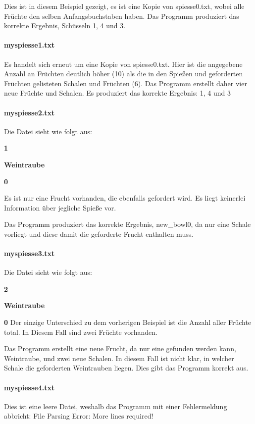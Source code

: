 \documentclass[a4paper,10pt,ngerman]{scrartcl}
\begin{document}
Dies ist in diesem Beispiel gezeigt, es ist eine Kopie von spiesse0.txt, wobei alle Früchte den selben Anfangsbuchstaben haben.
Das Programm produziert das korrekte Ergebnis, Schüsseln 1, 4 und 3.

\paragraph{myspiesse1.txt}
Es handelt sich erneut um eine Kopie von spiesse0.txt.
Hier ist die angegebene Anzahl an Früchten deutlich höher (10) als die in den Spießen und geforderten Früchten gelisteten Schalen und Früchten (6).
Das Programm erstellt daher vier neue Früchte und Schalen.
Es produziert das korrekte Ergebnis: 1, 4 und 3

\paragraph{myspiesse2.txt}
Die Datei sieht wie folgt aus:

\textbf{1}

\textbf{Weintraube}

\textbf{0}

Es ist nur eine Frucht vorhanden, die ebenfalls gefordert wird.
Es liegt keinerlei Information über jegliche Spieße vor.

Das Programm produziert das korrekte Ergebnis, new\_bowl0, da nur eine Schale vorliegt und diese damit die geforderte Frucht enthalten muss.

\paragraph{myspiesse3.txt}
Die Datei sieht wie folgt aus:

\textbf{2}

\textbf{Weintraube}

\textbf{0}
Der einzige Unterschied zu dem vorherigen Beispiel ist die Anzahl aller Früchte total.
In Diesem Fall sind zwei Früchte vorhanden.

Das Programm erstellt eine neue Frucht, da nur eine gefunden werden kann, Weintraube, und zwei neue Schalen.
In diesem Fall ist nicht klar, in welcher Schale die geforderten Weintrauben liegen.
Dies gibt das Programm korrekt aus.

\paragraph{myspiesse4.txt}
Dies ist eine leere Datei, weshalb das Programm mit einer Fehlermeldung abbricht: \glqq File Parsing Error: More lines required!\grqq{}
\end{document}
